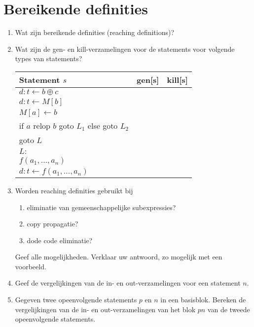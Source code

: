 \documentclass{report}
\begin{document}
\section{Bereikende definities}
	\begin{enumerate}
		\item Wat zijn bereikende definities (reaching definitions)?
		\item Wat zijn de gen- en kill-verzamelingen voor de statements voor volgende types van statements?
		\begin{table}[ht]
			\centering
			\begin{tabular}{l l l}
				Statement $s$ & gen[s] & kill[s] \\
				\hline
				$d : t \leftarrow b \oplus c$ & & \\
				$d : t \leftarrow M[b]$  & & \\
				$M[a] \leftarrow b$  & & \\
				if $a$ relop $b$ goto $L_1$ else goto $L_2$  & & \\
				goto $L$  & & \\
				$L :$  & & \\
				$f(a_1, ... , a_n)$  & & \\
				$d : t \leftarrow f(a_1, ..., a_n)$  & & \\
			\end{tabular}
		\end{table}
		\item Worden reaching definities gebruikt bij
		\begin{enumerate}
			\item eliminatie van gemeenschappelijke subexpressies?
			\item copy propagatie?
			\item dode code eliminatie?
		\end{enumerate}
		Geef alle mogelijkheden. Verklaar uw antwoord, zo mogelijk met een voorbeeld.
		\item Geef de vergelijkingen van de in- en out-verzamelingen voor een statement $n$.
		\item Gegeven twee opeenvolgende statements $p$ en $n$ in een basisblok. Bereken de vergelijkingen van de in- en out-verzamelingen van het blok $pn$ van de tweede opeenvolgende statements.
	\end{enumerate}
\end{document}
